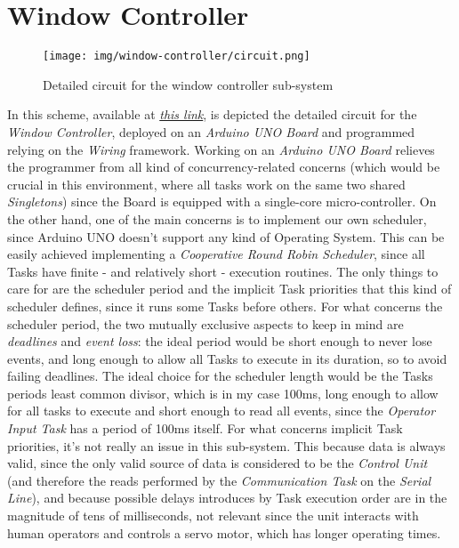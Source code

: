 \documentclass[a4paper,12pt]{report}
\begin{document}
	\section{Window Controller}
	\begin{figure}[H]
		\centering{}
		\texttt{[image: img/window-controller/circuit.png]}
		\caption{Detailed circuit for the window controller sub-system}
		\label{img:window-controller/circuit}
	\end{figure}
	In this scheme, available at \href{https://www.tinkercad.com/things/2nadVXk0wQ5-esiot-assignment-03-arduino?sharecode=t4LayAw_Rc1SNLqdSHt3uK_EuT6TttEPHQjHAwEp-Zc}{\textit{this link}}, is depicted the detailed circuit for the \textit{Window Controller}, deployed on an \textit{Arduino UNO Board} and programmed relying on the \textit{Wiring} framework.
	\newline Working on an \textit{Arduino UNO Board} relieves the programmer from all kind of concurrency-related concerns (which would be crucial in this environment, where all tasks work on the same two shared \textit{Singletons}) since the Board is equipped with a single-core micro-controller.
	\newline On the other hand, one of the main concerns is to implement our own scheduler, since Arduino UNO doesn't support any kind of Operating System. This can be easily achieved implementing a \textit{Cooperative Round Robin Scheduler}, since all Tasks have finite - and relatively short - execution routines. The only things to care for are the scheduler period and the implicit Task priorities that this kind of scheduler defines, since it runs some Tasks before others.
	\newline For what concerns the scheduler period, the two mutually exclusive aspects to keep in mind are \textit{deadlines} and \textit{event loss}: the ideal period would be short enough to never lose events, and long enough to allow all Tasks to execute in its duration, so to avoid failing deadlines. The ideal choice for the scheduler length would be the Tasks periods least common divisor, which is in my case 100ms, long enough to allow for all tasks to execute and short enough to read all events, since the \textit{Operator Input Task} has a period of 100ms itself.
	\newline For what concerns implicit Task priorities, it's not really an issue in this sub-system. This because data is always valid, since the only valid source of data is considered to be the \textit{Control Unit} (and therefore the reads performed by the \textit{Communication Task} on the \textit{Serial Line}), and because possible delays introduces by Task execution order are in the magnitude of tens of milliseconds, not relevant since the unit interacts with human operators and controls a servo motor, which has longer operating times.
\end{document}
